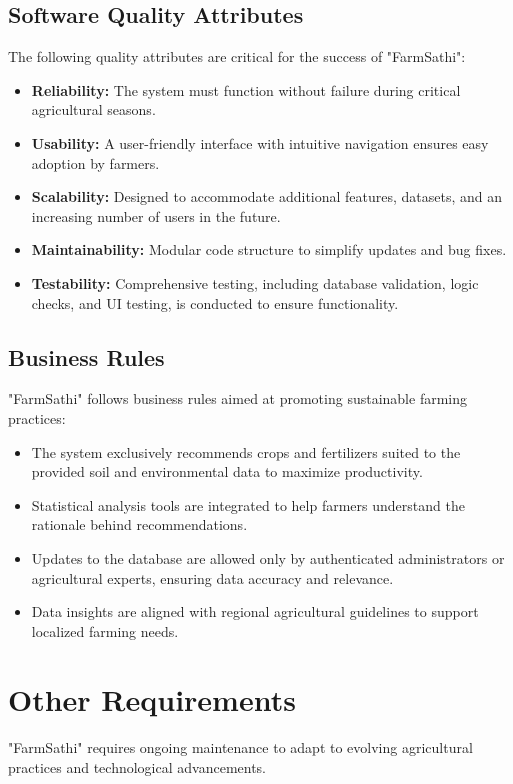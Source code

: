 \documentclass{scrreprt}
\begin{document}
\section{Software Quality Attributes}
The following quality attributes are critical for the success of "FarmSathi":
\begin{itemize}
    \item \textbf{Reliability:} The system must function without failure during critical agricultural seasons.
    \item \textbf{Usability:} A user-friendly interface with intuitive navigation ensures easy adoption by farmers.
    \item \textbf{Scalability:} Designed to accommodate additional features, datasets, and an increasing number of users in the future.
    \item \textbf{Maintainability:} Modular code structure to simplify updates and bug fixes.
    \item \textbf{Testability:} Comprehensive testing, including database validation, logic checks, and UI testing, is conducted to ensure functionality.
\end{itemize}

\section{Business Rules}
"FarmSathi" follows business rules aimed at promoting sustainable farming practices:
\begin{itemize}
    \item The system exclusively recommends crops and fertilizers suited to the provided soil and environmental data to maximize productivity.
    \item Statistical analysis tools are integrated to help farmers understand the rationale behind recommendations.
    \item Updates to the database are allowed only by authenticated administrators or agricultural experts, ensuring data accuracy and relevance.
    \item Data insights are aligned with regional agricultural guidelines to support localized farming needs.
\end{itemize}

\chapter{Other Requirements}

"FarmSathi" requires ongoing maintenance to adapt to evolving agricultural practices and technological advancements. 
\end{document}
